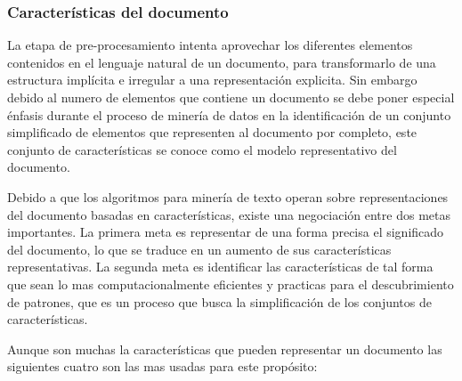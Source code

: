   \subsubsection{Características del documento}
    La etapa de pre-procesamiento intenta aprovechar los diferentes elementos contenidos en el lenguaje natural de un documento, para transformarlo de una estructura implícita e irregular a una representación explicita. Sin embargo debido al numero de elementos que contiene un documento se debe poner especial énfasis durante el proceso de minería de datos en la identificación de un conjunto simplificado de elementos que representen al documento por completo, este conjunto de características se conoce como el modelo representativo del documento.\cite{tmhandbook}

    Debido a que los algoritmos para minería de texto operan sobre representaciones del documento basadas en características, existe una negociación entre dos metas importantes. La primera meta es representar de una forma precisa el significado del documento, lo que se traduce en un aumento de sus características representativas.
    La segunda meta es identificar las características de tal forma que sean lo mas computacionalmente eficientes y practicas para el descubrimiento de patrones, que es un proceso que busca la simplificación de los conjuntos de características.\cite{tmhandbook}

    Aunque son muchas la características que pueden representar un documento las siguientes cuatro son las mas usadas para este propósito:

